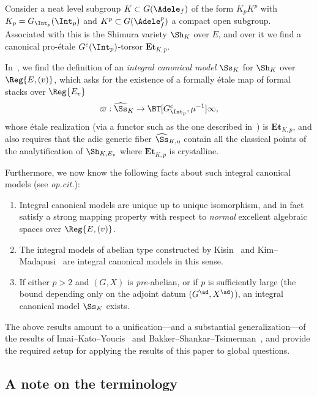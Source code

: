 \documentclass[10pt]{amsart}
\begin{document}
Consider a neat level subgroup $K\subset G(\Adele_f)$ of the form $K_pK^p$ with $K_p = G_{\Int_p}(\Int_p)$ and $K^p\subset G(\Adele_f^p)$ a compact open subgroup. Associated with this is the Shimura variety $\Sh_K$ over $E$, and over it we find a canonical pro-\'etale $G^c(\Int_p)$-torsor $\mathbf{Et}_{K,p}$. 

In~\cite{MadYoucis}, we find the definition of an \emph{integral canonical model} $\Ss_K$ for $\Sh_K$ over $\Reg{E,(v)}$, which asks for the existence of a formally \'etale map of formal stacks over $\Reg{E_v}$
\[
  \varpi: \widehat{\Ss}_K\to \BT[G^c_{\Int_p},\mu^{-1}]{\infty},
\]
whose \'etale realization (via a functor such as the one described in~\cite[\S 6.3]{bhatt_lectures}) is $\mathbf{Et}_{K,p}$, and also requires that the adic generic fiber $\widehat{\Ss}_{K,\eta}$ contain all the classical points of the analytification of $\Sh_{K,E_v}$ where $\mathbf{Et}_{K,p}$ is crystalline.

Furthermore, we now know the following facts about such integral canonical models (see \emph{op.\@ cit.}):
\begin{enumerate}
   \item Integral canonical models are unique up to unique isomorphism, and in fact satisfy a strong mapping property with respect to \emph{normal} excellent algebraic spaces over $\Reg{E,(v)}$.

   \item The integral models of abelian type constructed by Kisin~\cite{kisin:abelian} and Kim--Madapusi~\cite{Kim2016-fb} are integral canonical models in this sense.

   \item If either $p>2$ and $(G,X)$ is \emph{pre}-abelian, or if $p$ is sufficiently large (the bound depending only on the adjoint datum $(G^{\ad},X^{\ad})$), an integral canonical model $\Ss_K$ exists.
 \end{enumerate}
The above results amount to a unification---and a substantial generalization---of the results of Imai--Kato--Youcis~\cite{imai2023prismatic} and Bakker--Shankar--Tsimerman~\cite{bst}, and provide the required setup for applying the results of this paper to global questions.


\subsection{A note on the terminology}
\end{document}
